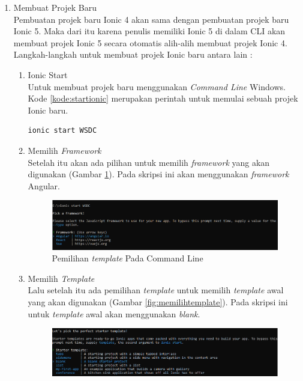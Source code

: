 \begin{enumerate}
	\begin{enumerate}
		\item Membuat Projek Baru \\
		Pembuatan projek baru Ionic 4 akan sama dengan pembuatan projek baru Ionic 5. Maka dari itu karena penulis memiliki Ionic 5 di dalam CLI akan membuat projek Ionic 5 secara otomatis alih-alih membuat projek Ionic 4. Langkah-langkah untuk membuat projek Ionic baru antara lain :
		\begin{enumerate}
			\item Ionic Start \\
			Untuk membuat projek baru menggunakan {\it Command Line} Windows. Kode \ref{kode:startionic} merupakan perintah untuk memulai sebuah projek Ionic baru.
			\begin{lstlisting}[language=bash, label=kode:startionic]
			  ionic start WSDC
			\end{lstlisting} 
			\item Memilih {\it Framework} \\
			Setelah itu akan ada pilihan untuk memilih {\it framework} yang akan digunakan (Gambar \ref{fig:memilihframework}). Pada skripsi ini akan menggunakan {\it framework} Angular.
			\begin{figure}[H]
			    \centering
			    \includegraphics[scale=0.6]{Gambar/ssmemilhframework.png}
			    \caption{Pemilihan {\it template} Pada Command Line}
			    \label{fig:memilihframework}
			\end{figure}			
			\item Memilih {\it Template} \\
			Lalu setelah itu ada pemilihan {\it template} untuk memilih {\it template} awal yang akan digunakan (Gambar \ref{fig:memilihtemplate}). Pada skripsi ini untuk {\it template} awal akan menggunakan {\it blank}.
			\begin{figure}[H]
			    \centering
			    \includegraphics[scale=0.6]{Gambar/ssmemilihtemplate.png}

\end{figure}
\end{enumerate}
\end{enumerate}
\end{enumerate}
